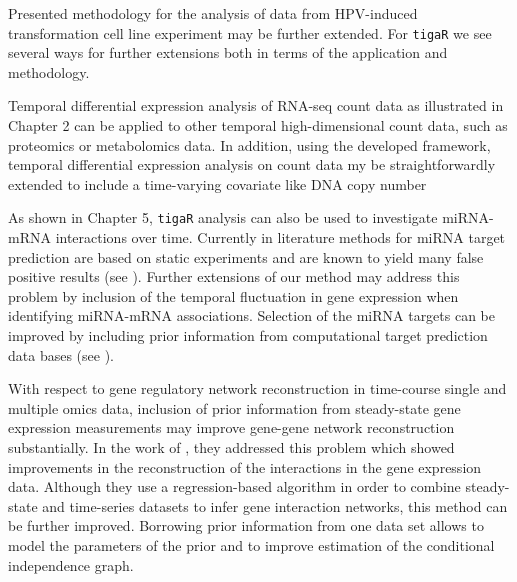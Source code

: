 \begin{conclusion}
Presented methodology for the analysis of data from HPV-induced transformation cell line experiment may be further extended. For {\tt tigaR} we see several ways for further extensions both in terms of the application and methodology. 
\begin{compactitem}

\item Temporal differential expression analysis of RNA-seq count data as illustrated in Chapter 2 can be applied to other temporal high-dimensional count data, such as proteomics or metabolomics data. In addition, using the developed framework, temporal differential expression analysis on count data my be straightforwardly extended to include a time-varying covariate like DNA copy number 

\item As shown in Chapter 5, {\tt tigaR} analysis can also be used to investigate miRNA-mRNA interactions over time. Currently in literature methods for miRNA target prediction are based on static experiments and are known to yield many false positive results (see \cite{Pinzon2017}). Further extensions of our method may address this problem by inclusion of the temporal fluctuation in gene expression when identifying miRNA-mRNA associations. Selection of the miRNA targets can be improved by including prior information from computational target prediction data bases (see \cite{Tabas2014}). 
\end{compactitem}

With respect to gene regulatory network reconstruction in time-course single and multiple omics data, inclusion of prior information from steady-state gene
expression measurements may improve gene-gene network reconstruction substantially. In the work of \cite{Wang2013}, they addressed this problem which
showed improvements in the reconstruction of the interactions in the gene expression data. Although they use a regression-based algorithm in order to combine steady-state and time-series datasets to infer gene interaction networks, this method can be further improved. Borrowing prior information from one data
set allows to model the parameters of the prior and to improve estimation of the conditional independence graph.


\end{conclusion}
